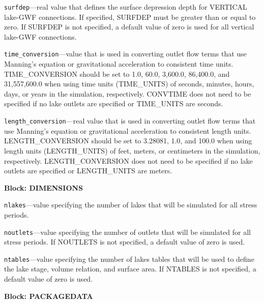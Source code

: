 \begin{description}
\item \texttt{surfdep}---real value that defines the surface depression depth for VERTICAL lake-GWF connections. If specified, SURFDEP must be greater than or equal to zero. If SURFDEP is not specified, a default value of zero is used for all vertical lake-GWF connections.

\item \texttt{time\_conversion}---value that is used in converting outlet flow terms that use Manning's equation or gravitational acceleration to consistent time units. TIME\_CONVERSION should be set to 1.0, 60.0, 3,600.0, 86,400.0, and 31,557,600.0 when using time units (TIME\_UNITS) of seconds, minutes, hours, days, or years in the simulation, respectively. CONVTIME does not need to be specified if no lake outlets are specified or TIME\_UNITS are seconds.

\item \texttt{length\_conversion}---real value that is used in converting outlet flow terms that use Manning's equation or gravitational acceleration to consistent length units. LENGTH\_CONVERSION should be set to 3.28081, 1.0, and 100.0 when using length units (LENGTH\_UNITS) of feet, meters, or centimeters in the simulation, respectively. LENGTH\_CONVERSION does not need to be specified if no lake outlets are specified or LENGTH\_UNITS are meters.

\end{description}
\item \textbf{Block: DIMENSIONS}

\begin{description}
\item \texttt{nlakes}---value specifying the number of lakes that will be simulated for all stress periods.

\item \texttt{noutlets}---value specifying the number of outlets that will be simulated for all stress periods. If NOUTLETS is not specified, a default value of zero is used.

\item \texttt{ntables}---value specifying the number of lakes tables that will be used to define the lake stage, volume relation, and surface area. If NTABLES is not specified, a default value of zero is used.

\end{description}
\item \textbf{Block: PACKAGEDATA}

